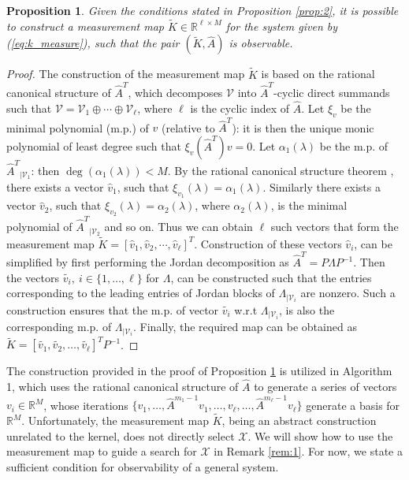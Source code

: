 \documentclass[letterpaper,12pt,peerreviewca,draftcls]{IEEEtran}
\newtheorem{proposition}{Proposition}
\newcommand{\la}{\lambda}
\newcommand{\R}{\mathbb{R}}
\newcommand{\eval}{\la}
\newcommand{\empK}{\ensuremath{K}}
\newcommand{\sampSet}{\mathcal{X}}
\newcommand{\ncent}{M}
\renewcommand{\eqref}[1]{(\ref{eq:#1})}
\newcommand{\JorP}{P}
\newcommand{\JorLa}{\Lambda}
\newcommand{\minpoly}{\alpha}
\newcommand{\minpolyv}{\xi}
\newcommand{\linvec}{v}
\newcommand{\acycdeg}{m}
\newcommand{\minmeas}{\ell}
\newcommand{\linspace}{\mathcal{V}}
\newcommand{\measmap}{\widetilde{\empK}}
\newcommand{\dualop}{A}
\newcommand{\dualopApprox}{\widehat{\dualop}}
\DeclareMathOperator{\degs}{deg}
\begin{document}
\begin{proposition}\label{prop:3}
Given the conditions stated in Proposition \ref{prop:2}, it is possible to construct a measurement map $\measmap \in \R^{\minmeas\times\ncent}$ for the system given by \eqref{k_measure}, such that the pair $(\measmap, \dualopApprox)$ is observable.
\end{proposition}
\begin{proof}
	The construction of the measurement map $\measmap$ is based on the rational canonical structure of $\dualopApprox^T$, which decomposes $ \linspace $ into $\dualopApprox^T$-cyclic direct summands such that $\linspace = \linspace_1 \oplus \cdots \oplus \linspace_\minmeas$, where $\minmeas$ is the cyclic index of $\dualopApprox$. Let $\minpolyv_{\linvec}$ be the minimal polynomial (m.p.) of $ \linvec $ (relative to $\dualopApprox^T$): it is then the unique monic polynomial of least degree such that $\minpolyv_{\linvec}(\dualopApprox^T)\linvec=0$. Let $\minpoly_1(\eval)$ be the m.p. of ${\dualopApprox^T}_{|\linspace_1}$: then $\degs(\minpoly_1(\eval)) < \ncent$. By the rational canonical structure theorem \cite{wonham1974linear}, there exists a vector $\widehat{\linvec}_1$, such that $\minpolyv_{\linvec_1}(\eval)=\minpoly_1(\eval)$. Similarly there exists a vector $\widehat{\linvec}_2$, such that $\minpolyv_{\linvec_2}(\eval)=\minpoly_2(\eval)$, where $\minpoly_2(\eval)$, is the minimal polynomial of ${\dualopApprox^T}_{|\linspace_2}$ and so on. Thus we can obtain $\minmeas$ such vectors that form the measurement map $\measmap = [\widehat{\linvec}_1, \widehat{\linvec}_2,\cdots, \widehat{\linvec}_\minmeas]^T$. Construction of these vectors $\widehat{\linvec}_i$, can be simplified by first performing the Jordan decomposition as $ \dualopApprox^T = \JorP\JorLa\JorP^{-1} $. Then the vectors $ \widetilde{\linvec_i},\ i\in \{1,\dots,\minmeas\}$ for $ \JorLa $, can be constructed such that the entries corresponding to the leading entries of Jordan blocks of $ \JorLa_{|\linspace_i} $ are nonzero. Such a construction ensures that the m.p. of vector $ \widetilde{\linvec_i}$ w.r.t $\JorLa_{|\linspace_i}$, is also the corresponding m.p. of 
	$\JorLa_{|\linspace_i}$. Finally, the required map can be obtained as $ \measmap = [\widetilde{\linvec_1}, \widetilde{\linvec_2},\dots,\widetilde{\linvec_\minmeas}]^T\JorP^{-1}$.
\end{proof}

The construction provided in the proof of Proposition \ref{prop:3} is utilized in Algorithm 1, which uses the rational canonical structure of $\dualopApprox$ to generate a series of vectors $\linvec_i\in\R^{\ncent}$, whose iterations $\{\linvec_1,\dots,\dualopApprox^{\acycdeg_1-1}\linvec_1,\dots,\linvec_{\minmeas},\dots,\dualopApprox^{\acycdeg_{\minmeas}-1}\linvec_{\minmeas}\}$ generate a basis for $\R^{\ncent}$.
Unfortunately, the measurement map $\measmap$, being an abstract construction unrelated to the kernel, does not directly select $\sampSet$. We will show how to use the measurement map to guide a search for $\sampSet$ in Remark \ref{rem:1}. For now, we state a sufficient condition for observability of a general system. 
\end{document}
